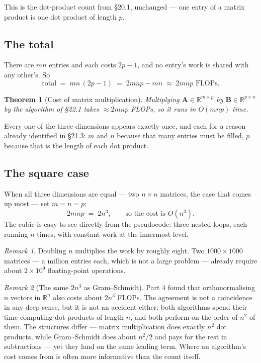 \documentclass[11pt]{article}
\theoremstyle{plain}
\newtheorem{thm}{Theorem}[section]
\theoremstyle{definition}
\theoremstyle{remark}
\newtheorem*{rmk}{Remark}
\newcommand{\R}{\mathbb{R}}
\newcommand{\mt}[1]{\mathbf{#1}}
\begin{document}
\noindent This is the dot-product count from \S20.1, unchanged --- one entry of
a matrix product is one dot product of length $p$.

\subsection{The total}
There are $mn$ entries and each costs $2p-1$, and no entry's work is shared with
any other's. So
\[
  \text{total}
  \;=\; mn\,(2p-1)
  \;=\; 2mnp - mn
  \;\approx\; 2mnp \text{ FLOPs} .
\]

\begin{thm}[Cost of matrix multiplication]
Multiplying $\mt{A}\in\R^{m\times p}$ by $\mt{B}\in\R^{p\times n}$ by the
algorithm of \S22.1 takes $\approx 2mnp$ FLOPs, so it runs in $O(mnp)$ time.
\end{thm}

\noindent Every one of the three dimensions appears exactly once, and each for a
reason already identified in \S21.3: $m$ and $n$ because that many entries must
be filled, $p$ because that is the length of each dot product.

\subsection{The square case}
When all three dimensions are equal --- two $n\times n$ matrices, the case that
comes up most --- set $m=n=p$:
\[
  2mnp \;=\; 2n^{3},
  \qquad\text{so the cost is } O(n^{3}) .
\]
The cubic is easy to see directly from the pseudocode: three nested loops, each
running $n$ times, with constant work at the innermost level.

\begin{rmk}
Doubling $n$ multiplies the work by roughly eight. Two $1000\times1000$
matrices --- a million entries each, which is not a large problem --- already
require about $2\times10^{9}$ floating-point operations.
\end{rmk}

\begin{rmk}[The same $2n^{3}$ as Gram--Schmidt]
Part 4 found that orthonormalising $n$ vectors in $\R^{n}$ also costs about
$2n^{3}$ FLOPs. The agreement is not a coincidence in any deep sense, but it is
not an accident either: both algorithms spend their time computing dot products
of length $n$, and both perform on the order of $n^{2}$ of them. The structures
differ --- matrix multiplication does exactly $n^{2}$ dot products, while
Gram--Schmidt does about $n^{2}/2$ and pays for the rest in subtractions --- yet
they land on the same leading term. Where an algorithm's cost comes from is
often more informative than the count itself.
\end{rmk}
\end{document}
